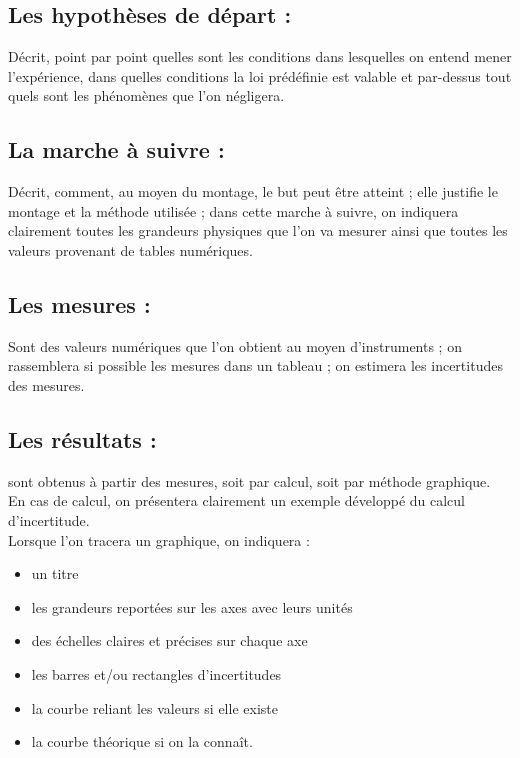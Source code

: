 \documentclass[../main.tex]{subfiles}
\begin{document}
\subsection{Les hypothèses de départ : }
Décrit, point par point quelles sont les conditions dans lesquelles on entend mener l'expérience, dans quelles conditions la loi prédéfinie est valable et par-dessus tout quels sont les phénomènes que l'on négligera.
\subsection{La marche à suivre : }
Décrit, comment, au moyen du montage, le but peut être atteint ; elle justifie le montage et la méthode utilisée ; dans cette marche à suivre, on indiquera clairement toutes les grandeurs physiques que l'on va mesurer ainsi que toutes les valeurs provenant de tables numériques.
\subsection{Les mesures : }
Sont des valeurs numériques que l'on obtient au moyen d'instruments ; on rassemblera si possible les mesures dans un tableau ; on estimera les incertitudes des mesures.
\subsection{Les résultats : }
sont obtenus à partir des mesures, soit par calcul, soit par méthode graphique.\\
En cas de calcul, on présentera clairement un exemple développé du calcul d'incertitude.\\
Lorsque l'on tracera un graphique, on indiquera :
\begin{itemize}
    \item un titre
    \item les grandeurs reportées sur les axes avec leurs unités
    \item des échelles claires et précises sur chaque axe
    \item les barres et/ou rectangles d'incertitudes
    \item la courbe reliant les valeurs si elle existe
    \item la courbe théorique si on la connaît.
\end{itemize}
\end{document}
